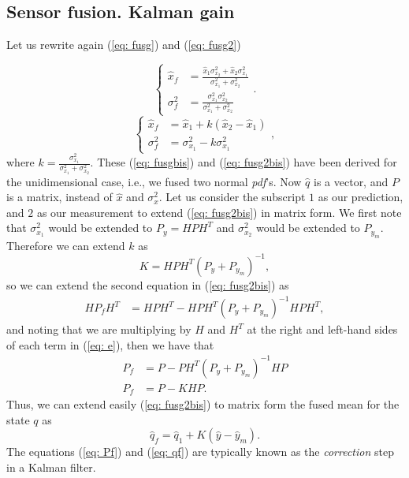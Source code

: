 \documentclass[11pt,a4paper]{article}
\begin{document}
\subsection{Sensor fusion. Kalman gain}
Let us rewrite again (\ref{eq: fusg}) and (\ref{eq: fusg2})

\begin{equation}
	\begin{cases}
		\hat x_f &= \frac{\hat x_1\sigma_{x_2}^2 + \hat x_2\sigma_{x_1}^2 }{\sigma_{x_1}^2 + \sigma_{x_2}^2} \\
		\sigma_f^2 &= \frac{\sigma_{x_1}^2 \sigma_{x_2}^2}{\sigma_{x_1}^2 + \sigma_{x_2}^2}
	\end{cases}.
	\label{eq: fusgbis}
\end{equation}
\begin{equation}
	\begin{cases}
		\hat x_f &= \hat x_1 + k(\hat x_2 - \hat x_1) \\
		\sigma_f^2 &= \sigma_{x_1}^2 - k\sigma_{x_1}^2
	\end{cases},
	\label{eq: fusg2bis}
\end{equation}
where $k = \frac{\sigma_{x_1}^2}{\sigma_{x_1}^2 + \sigma_{x_2}^2}$. These (\ref{eq: fusgbis}) and (\ref{eq: fusg2bis}) have been derived for the unidimensional case, i.e., we fused two normal \emph{pdf}'s. Now $\hat q$ is a vector, and $P$ is a matrix, instead of $\hat x$ and $\sigma_x^2$. Let us consider the subscript $1$ as our prediction, and $2$ as our measurement to extend (\ref{eq: fusg2bis}) in matrix form. We first note that $\sigma_{x_1}^2$ would be extended to $P_y = HPH^T$ and $\sigma_{x_2}^2$ would be extended to $P_{y_m}$. Therefore we can extend $k$ as
\begin{equation}
K = HPH^T (P_y + P_{y_m})^{-1},
\end{equation}
so we can extend the second equation in (\ref{eq: fusg2bis}) as
\begin{align}
	HP_fH^T &= HPH^T -  HPH^T (P_y + P_{y_m})^{-1} HPH^T,
	\label{eq: e}
\end{align}
and noting that we are multiplying by $H$ and $H^T$ at the right and left-hand sides of each term in (\ref{eq: e}), then we have that
\begin{align}
	P_f &= P - PH^T(P_y + P_{y_m})^{-1} HP \nonumber \\
	P_f &= P - KHP. \label{eq: Pf}
\end{align}
Thus, we can extend easily (\ref{eq: fusg2bis}) to matrix form the fused mean for the state $q$ as
\begin{equation}
	\hat q_f = \hat q_1 + K(\hat y - \hat y_m).
	\label{eq: qf}
\end{equation}
The equations (\ref{eq: Pf}) and (\ref{eq: qf}) are typically known as the \emph{correction} step in a Kalman filter.
\end{document}
